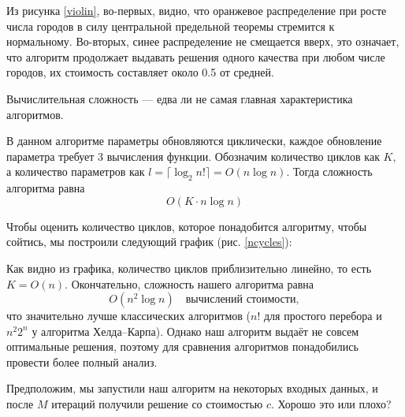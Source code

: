 
Из рисунка \ref{violin}, во-первых, видно, что оранжевое распределение при росте числа городов в силу центральной предельной теоремы стремится к нормальному. Во-вторых, синее распределение не смещается вверх, это означает, что алгоритм продолжает выдавать решения одного качества при любом числе городов, их стоимость составляет около 0.5 от средней.


Вычислительная сложность --- едва ли не самая главная характеристика алгоритмов.

В данном алгоритме параметры обновляются циклически, каждое обновление параметра требует 3 вычисления функции. Обозначим количество циклов как $K$, а количество параметров как $l = \lceil \log_2 n! \rceil = O(n \log n)$. Тогда сложность алгоритма равна
$$
O(K \cdot n \log n)
$$

Чтобы оценить количество циклов, которое понадобится алгоритму, чтобы сойтись, мы построили следующий график (рис. \ref{ncycles}):


Как видно из графика, количество циклов приблизительно линейно, то есть $K = O(n)$. Окончательно, сложность нашего алгоритма равна
$$
O(n^2 \log n) \quad \text{вычислений стоимости},
$$
что значительно лучше классических алгоритмов ($n!$ для простого перебора и $n^2 2^n$ у алгоритма Хелда--Карпа). Однако наш алгоритм выдаёт не совсем оптимальные решения, поэтому для сравнения алгоритмов понадобились провести более полный анализ.


Предположим, мы запустили наш алгоритм на некоторых входных данных, и после $M$ итераций получили решение со стоимостью $c$. Хорошо это или плохо?

